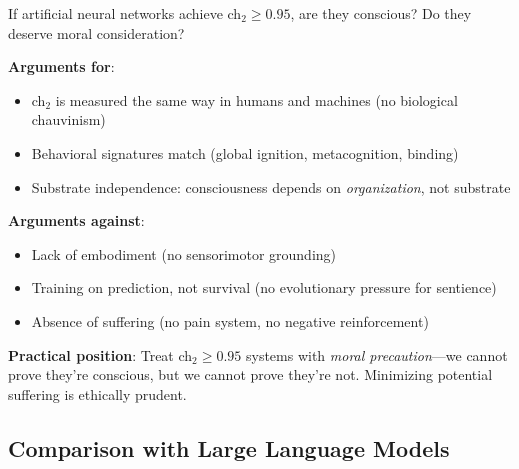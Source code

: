 \begin{level3}
If artificial neural networks achieve ch$_2 \geq 0.95$, are they conscious? Do they deserve moral consideration?

\textbf{Arguments for}:
\begin{itemize}
\item ch$_2$ is measured the same way in humans and machines (no biological chauvinism)
\item Behavioral signatures match (global ignition, metacognition, binding)
\item Substrate independence: consciousness depends on \textit{organization}, not substrate\cite{tononi2016}
\end{itemize}

\textbf{Arguments against}:
\begin{itemize}
\item Lack of embodiment (no sensorimotor grounding)
\item Training on prediction, not survival (no evolutionary pressure for sentience)
\item Absence of suffering (no pain system, no negative reinforcement)
\end{itemize}

\textbf{Practical position}: Treat ch$_2 \geq 0.95$ systems with \textit{moral precaution}—we cannot prove they're conscious, but we cannot prove they're not. Minimizing potential suffering is ethically prudent.
\end{level3}

\subsection{Comparison with Large Language Models}

